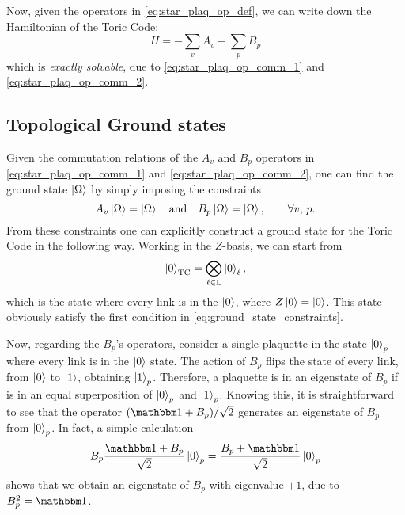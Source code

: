 Now, given the operators in \eqref{eq:star_plaq_op_def}, we can write down the Hamiltonian of the Toric Code:
\begin{equation}
    H = - \sum_{v} A_v - \sum_{p} B_p
    \label{eq:toric_code_hamiltonian}
\end{equation}
which is \emph{exactly solvable}, due to \eqref{eq:star_plaq_op_comm_1} and \eqref{eq:star_plaq_op_comm_2}.


\begin{figure}[t]
\end{figure}



%
%
\subsection{Topological Ground states}
\label{sub:topological_ground_states}

Given the commutation relations of the $A_v$ and $B_p$ operators in \eqref{eq:star_plaq_op_comm_1} and \eqref{eq:star_plaq_op_comm_2}, one can find the ground state $\ket{\Omega}$ by simply imposing the constraints
\begin{equation}
    A_v \ket{\Omega} = \ket{\Omega} \qand
    B_p \ket{\Omega} = \ket{\Omega}, \qquad \forall v,\, p.
    \label{eq:ground_state_constraints}
\end{equation}
From these constraints one can explicitly construct a ground state for the Toric Code in the following way.
Working in the $Z$-basis, we can start from
\begin{equation}
    \ket{0}_{\text{TC}} = \bigotimes_{\ell \in \mathbb{L}} \ket{0}_{\ell},
\end{equation}
which is the state where every link is in the $\ket{0}$, where $Z \ket{0} = \ket{0}$.
This state obviously satisfy the first condition in \eqref{eq:ground_state_constraints}.

Now, regarding the $B_p$'s operators, consider a single plaquette in the state $\ket{0}_p$ where every link is in the $\ket{0}$ state.
The action of $B_p$ flips the state of every link, from $\ket{0}$ to $\ket{1}$, obtaining $\ket{1}_p$.
Therefore, a plaquette is in an eigenstate of $B_p$ if is in an equal superposition of $\ket{0}_p$ and $\ket{1}_p$.
Knowing this, it is straightforward to see that the operator $(\identity + B_p)/\sqrt{2}$ generates an eigenstate of $B_p$ from $\ket{0}_p$.
In fact, a simple calculation
\begin{equation}
    B_p \frac{\identity + B_p}{\sqrt{2}} \ket{0}_p = \frac{B_p + \identity}{\sqrt{2}} \ket{0}_p
\end{equation}
shows that we obtain an eigenstate of $B_p$ with eigenvalue $+1$, due to $B_p^2 = \identity$.

